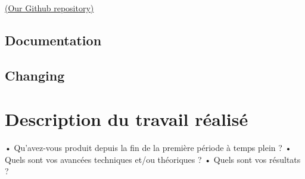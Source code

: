 \documentclass[11pt]{article}
\begin{document}
\href{https://github.com/LGPolytech/Project_S9}{(Our Github repository)}



\subsection{Documentation}

\subsection{Changing}

\pagebreak

\section{Description du travail réalisé}

•	Qu’avez-vous produit depuis la fin de la première période à temps plein ?
•	Quels sont vos avancées techniques et/ou théoriques ?
•	Quels sont vos résultats ?
\end{document}
